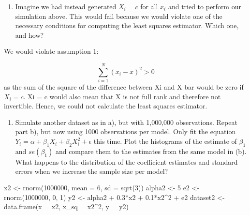 \documentclass[
]{article}
\newenvironment{Shaded}{\begin{snugshade}}{\end{snugshade}}
\newcommand{\AttributeTok}[1]{\textcolor[rgb]{0.77,0.63,0.00}{#1}}
\newcommand{\DecValTok}[1]{\textcolor[rgb]{0.00,0.00,0.81}{#1}}
\newcommand{\FloatTok}[1]{\textcolor[rgb]{0.00,0.00,0.81}{#1}}
\newcommand{\FunctionTok}[1]{\textcolor[rgb]{0.00,0.00,0.00}{#1}}
\newcommand{\NormalTok}[1]{#1}
\newcommand{\OtherTok}[1]{\textcolor[rgb]{0.56,0.35,0.01}{#1}}
\newcommand{\SpecialCharTok}[1]{\textcolor[rgb]{0.00,0.00,0.00}{#1}}
\providecommand{\tightlist}{%
  \setlength{\itemsep}{0pt}\setlength{\parskip}{0pt}}
\begin{document}
\begin{enumerate}
\def\labelenumi{\alph{enumi}.}
\setcounter{enumi}{2}
\tightlist
\item
  Imagine we had instead generated \(X_i = c\) for all \(x_i\) and tried
  to perform our simulation above. This would fail because we would
  violate one of the necessary conditions for computing the least
  squares estimator. Which one, and how?
\end{enumerate}

We would violate assumption 1:

\[
\sum_{i=1}^{N} (x_i - \bar{x})^2 > 0 
\] as the sum of the square of the difference between Xi and X bar would
be zero if \(X_i = c\). Xi = c would also mean that X is not full rank
and therefore not invertible. Hence, we could not calculate the least
squares estimator.

\begin{enumerate}
\def\labelenumi{\alph{enumi}.}
\setcounter{enumi}{3}
\tightlist
\item
  Simulate another dataset as in a), but with 1,000,000 observations.
  Repeat part b), but now using 1000 observations per model. Only fit
  the equation \(Y_i = \alpha + \beta_1 X_i + \beta_2 X_i^2 + \epsilon\)
  this time. Plot the histograms of the estimate of \(\beta_1\) and
  \(se(\beta_1)\) and compare them to the estimates from the same model
  in (b). What happens to the distribution of the coefficient estimates
  and standard errors when we increase the sample size per model?
\end{enumerate}

\small

\begin{Shaded}
\begin{Highlighting}[]
\NormalTok{x2 }\OtherTok{\textless{}{-}} \FunctionTok{rnorm}\NormalTok{(}\DecValTok{1000000}\NormalTok{, }\AttributeTok{mean =} \DecValTok{6}\NormalTok{, }\AttributeTok{sd =} \FunctionTok{sqrt}\NormalTok{(}\DecValTok{3}\NormalTok{))}
\NormalTok{alpha2 }\OtherTok{\textless{}{-}} \DecValTok{5}
\NormalTok{e2 }\OtherTok{\textless{}{-}} \FunctionTok{rnorm}\NormalTok{(}\DecValTok{1000000}\NormalTok{, }\DecValTok{0}\NormalTok{, }\DecValTok{1}\NormalTok{)}
\NormalTok{y2 }\OtherTok{\textless{}{-}}\NormalTok{ alpha2 }\SpecialCharTok{+} \FloatTok{0.3}\SpecialCharTok{*}\NormalTok{x2 }\SpecialCharTok{+} \FloatTok{0.1}\SpecialCharTok{*}\NormalTok{x2}\SpecialCharTok{\^{}}\DecValTok{2} \SpecialCharTok{+}\NormalTok{ e2}
\NormalTok{dataset2 }\OtherTok{\textless{}{-}} \FunctionTok{data.frame}\NormalTok{(}\AttributeTok{x =}\NormalTok{ x2, }\AttributeTok{x\_sq =}\NormalTok{ x2}\SpecialCharTok{\^{}}\DecValTok{2}\NormalTok{, }\AttributeTok{y =}\NormalTok{ y2)}
\end{Highlighting}
\end{Shaded}
\end{document}
